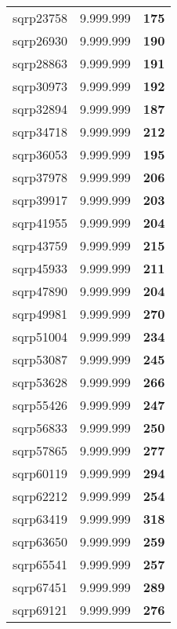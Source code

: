\begin{tabular}{cc||c}
sqrp23758        & 9.999.999        & {\bf 175}       \\ 
sqrp26930        & 9.999.999        & {\bf 190}       \\ 
sqrp28863        & 9.999.999        & {\bf 191}       \\ 
sqrp30973        & 9.999.999        & {\bf 192}       \\ 
sqrp32894        & 9.999.999        & {\bf 187}       \\ 
sqrp34718        & 9.999.999        & {\bf 212}       \\ 
sqrp36053        & 9.999.999        & {\bf 195}       \\ 
sqrp37978        & 9.999.999        & {\bf 206}       \\ 
sqrp39917        & 9.999.999        & {\bf 203}       \\ 
sqrp41955        & 9.999.999        & {\bf 204}       \\ 
sqrp43759        & 9.999.999        & {\bf 215}       \\ 
sqrp45933        & 9.999.999        & {\bf 211}       \\ 
sqrp47890        & 9.999.999        & {\bf 204}       \\ 
sqrp49981        & 9.999.999        & {\bf 270}       \\ 
sqrp51004        & 9.999.999        & {\bf 234}       \\ 
sqrp53087        & 9.999.999        & {\bf 245}       \\ 
sqrp53628        & 9.999.999        & {\bf 266}       \\ 
sqrp55426        & 9.999.999        & {\bf 247}       \\ 
sqrp56833        & 9.999.999        & {\bf 250}       \\ 
sqrp57865        & 9.999.999        & {\bf 277}       \\ 
sqrp60119        & 9.999.999        & {\bf 294}       \\ 
sqrp62212        & 9.999.999        & {\bf 254}       \\ 
sqrp63419        & 9.999.999        & {\bf 318}       \\ 
sqrp63650        & 9.999.999        & {\bf 259}       \\ 
sqrp65541        & 9.999.999        & {\bf 257}       \\ 
sqrp67451        & 9.999.999        & {\bf 289}       \\ 
sqrp69121        & 9.999.999        & {\bf 276}       \\ 

\end{tabular}
